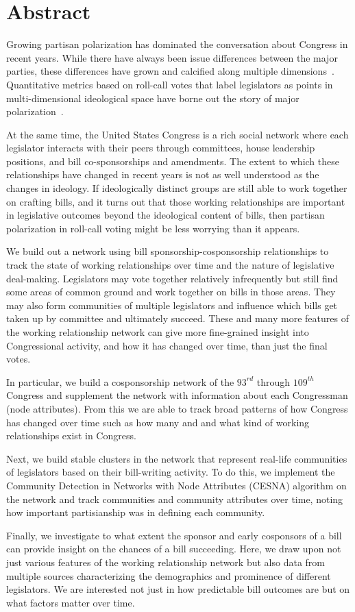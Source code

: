 \section{Abstract}

Growing partisan polarization has dominated the conversation about Congress in
recent years. While there have always been issue differences between the major
parties, these differences have grown and calcified along multiple
dimensions~\cite{Layman}. Quantitative metrics based on roll-call votes that
label legislators as points in multi-dimensional ideological space have borne
out the story of major polarization~\cite{Poole}.

At the same time, the United States Congress is a rich social network where each
legislator interacts with their peers through committees, house leadership
positions, and bill co-sponsorships and amendments. The extent to which these
relationships have changed in recent years is not as well understood as the
changes in ideology. If ideologically distinct groups are still able to work
together on crafting bills, and it turns out that those working relationships
are important in legislative outcomes beyond the ideological content of bills,
then partisan polarization in roll-call voting might be less worrying than it
appears.

We build out a network using bill sponsorship-cosponsorship relationships to
track the state of working relationships over time and the nature of legislative
deal-making. Legislators may vote together relatively infrequently but still
find some areas of common ground and work together on bills in those areas. They
may also form communities of multiple legislators and influence which bills get
taken up by committee and ultimately succeed. These and many more features of
the working relationship network can give more fine-grained insight into
Congressional activity, and how it has changed over time, than just the final
votes.

In particular, we build a cosponsorship network of the $93^{rd}$ through
$109^{th}$ Congress and supplement the network with information about each
Congressman (node attributes). From this we are able to track broad patterns of
how Congress has changed over time such as how many and and what kind of working
relationships exist in Congress.

Next, we build stable clusters in the network that represent real-life
communities of legislators based on their bill-writing activity. To do this, we
implement the Community Detection in Networks with Node Attributes (CESNA)
algorithm on the network and track communities and community attributes over
time, noting how important partisianship was in defining each community.

Finally, we investigate to what extent the sponsor and early cosponsors of a
bill can provide insight on the chances of a bill succeeding. Here, we draw upon
not just various features of the working relationship network but also data from
multiple sources characterizing the demographics and prominence of different
legislators. We are interested not just in how predictable bill outcomes are but
on what factors matter over time.
